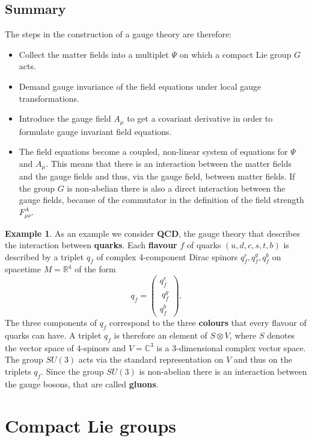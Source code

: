 \documentclass[11pt]{amsart}
\theoremstyle{definition}
\newtheorem{ex}[thm]{Example}
\theoremstyle{remark}
\numberwithin{equation}{section}
\begin{document}
\subsection{Summary}
The steps in the construction of a gauge theory are therefore:
\begin{itemize}
\item Collect the matter fields into a multiplet $\Psi$ on which a compact Lie group $G$ acts.
\item Demand gauge invariance of the field equations under local gauge transformations.
\item Introduce the gauge field $A_\mu$ to get a covariant derivative in order to formulate gauge invariant field equations.
\item The field equations become a coupled, non-linear system of equations for $\Psi$ and $A_\mu$. This means that there is an interaction between the matter fields and the gauge fields and thus, via the gauge field, between matter fields. If the group $G$ is non-abelian there is also a direct interaction between the gauge fields, because of the commutator in the definition of the field strength $F^A_{\mu\nu}$.
\end{itemize}
\begin{ex}
As an example we consider {\bf QCD}, the gauge theory that describes the interaction between {\bf quarks}. Each {\bf flavour} $f$ of quarks $(u, d, c, s, t, b)$ is described by a triplet $q_f$ of complex 4-component Dirac spinors $q_f^r,q_f^g,q_f^b$ on spacetime $M=\mathbb{R}^4$ of the form 
\begin{equation*}
q_f=\left(\begin{array}{c} q_f^r \\ \ q_f^g \\ q_f^b\end{array}\right).
\end{equation*}
The three components of $q_f$ correspond to the three {\bf colours} that every flavour of quarks can have. A triplet $q_f$ is therefore an element of $S\otimes V$, where $S$ denotes the vector space of 4-spinors and $V=\mathbb{C}^3$ is a 3-dimensional complex vector space. The group $SU(3)$ acts via the standard representation on $V$ and thus on the triplets $q_f$. Since the group $SU(3)$ is non-abelian there is an interaction between the gauge bosons, that are called {\bf gluons}.
\end{ex}





\section{Compact Lie groups}\label{sect compact lie groups}
\end{document}
